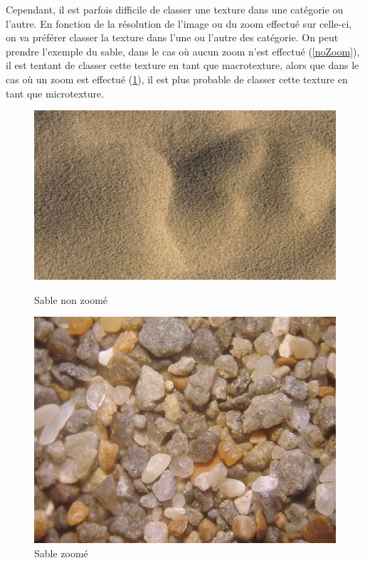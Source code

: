 Cependant, il est parfois difficile de classer une texture dans une catégorie ou l'autre. En fonction de la résolution de l'image ou du zoom effectué sur celle-ci, on va préférer classer la texture dans l'une ou l'autre des catégorie. On peut prendre l'exemple du sable, dans le cas où aucun zoom n'est effectué (\ref{noZoom}), il est tentant de classer cette texture en tant que macrotexture, alors que dans le cas où un zoom est effectué (\ref{Zoom}), il est plus probable de classer cette texture en tant que microtexture.

\begin{figure}
   \begin{minipage}[c]{.46\linewidth}
	  \centering
      \includegraphics[scale=0.16]{img/sableNoZoom.jpg}
      \caption{\label{noZoom} Sable non zoomé}
   \end{minipage} \hfill
   \begin{minipage}[c]{.46\linewidth}
      \centering
      \includegraphics[scale=0.2]{img/sableZoom.jpg}
      \caption{\label{Zoom} Sable zoomé}
   \end{minipage}
\end{figure}

